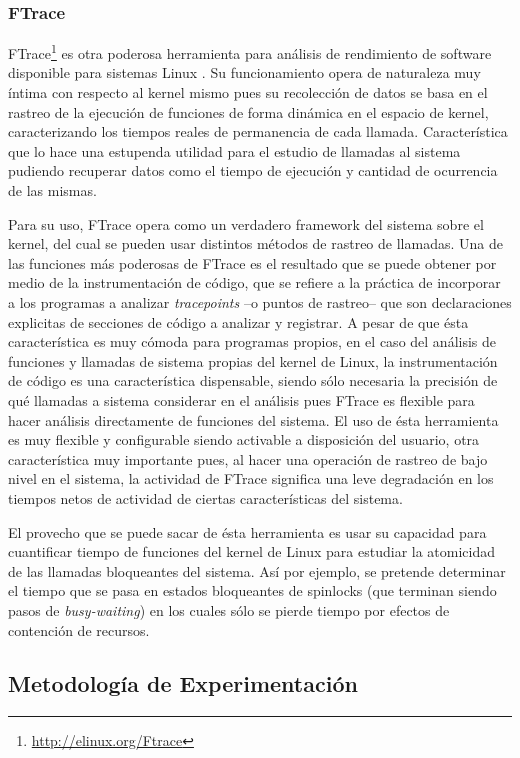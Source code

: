 \subsubsection{FTrace}
FTrace\footnote{\url{http://elinux.org/Ftrace}} es otra poderosa herramienta para análisis de rendimiento de software disponible para sistemas Linux \cite{paper:FTraceSony}. Su funcionamiento opera de naturaleza muy íntima con respecto al kernel mismo pues su recolección de datos se basa en el rastreo de la ejecución de funciones de forma dinámica en el espacio de kernel, caracterizando los tiempos reales de permanencia de cada llamada. Característica que lo hace una estupenda utilidad para el estudio de llamadas al sistema pudiendo recuperar datos como el tiempo de ejecución y cantidad de ocurrencia de las mismas.

Para su uso, FTrace opera como un verdadero framework del sistema sobre el kernel, del cual se pueden usar distintos métodos de rastreo de llamadas. Una de las funciones más poderosas de FTrace es el resultado que se puede obtener por medio de la instrumentación de código, que se refiere a la práctica de incorporar a los programas a analizar \emph{tracepoints} --o puntos de rastreo-- que son declaraciones explicitas de secciones de código a analizar y registrar. A pesar de que ésta característica es muy cómoda para programas propios, en el caso del análisis de funciones y llamadas de sistema propias del kernel de Linux, la instrumentación de código es una característica dispensable, siendo sólo necesaria la precisión de qué llamadas a sistema considerar en el análisis pues FTrace es flexible para hacer análisis directamente de funciones del sistema. El uso de ésta herramienta es muy flexible y configurable siendo activable a disposición del usuario, otra característica muy importante pues, al hacer una operación de rastreo de bajo nivel en el sistema, la actividad de FTrace significa una leve degradación en los tiempos netos de actividad de ciertas características del sistema.

El provecho que se puede sacar de ésta herramienta es usar su capacidad para cuantificar tiempo de funciones del kernel de Linux para estudiar la atomicidad de las llamadas bloqueantes del sistema. Así por ejemplo, se pretende determinar el tiempo que se pasa en estados bloqueantes de spinlocks (que terminan siendo pasos de \emph{busy-waiting}) en los cuales sólo se pierde tiempo por efectos de contención de recursos.

\subsection{Metodología de Experimentación}

